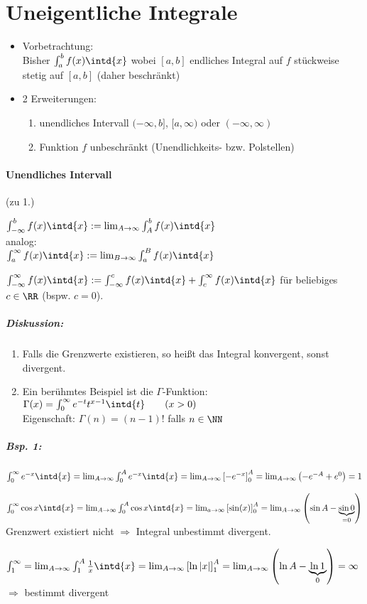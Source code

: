\section{Uneigentliche Integrale}
\begin{itemize}
\item Vorbetrachtung:\\
Bisher $\int_a^b f(x) \intd{x}$ wobei $[a,b]$ endliches Integral auf $f$ stückweise stetig auf $[a,b]$ (daher beschränkt)
\item 2 Erweiterungen:
\begin{enumerate}
\item unendliches Intervall $(-\infty, b]$, $[a,\infty)$ oder $(-\infty, \infty)$
\item Funktion $f$ unbeschränkt (Unendlichkeits- bzw. Polstellen)
\end{enumerate}
\end{itemize}
\paragraph{Unendliches Intervall} (zu 1.)
\begin{anumerate}
\item $\int_{-\infty}^b f(x) \intd{x}:= \lim_{A\to \infty} \int_A^b f(x) \intd{x}$\\
analog:\\
$\int_a^{\infty} f(x) \intd{x} := \lim_{B \to \infty} \int_a^{B} f(x) \intd{x}$
\item $\int_{-\infty}^{\infty} f(x) \intd{x} := \int_{-\infty}^c f(x) \intd{x} + \int_c^{\infty} f(x) \intd{x}$ für beliebiges $c \in \RR$ (bspw. $c=0$).
\end{anumerate}
\subparagraph{Diskussion:}
\begin{enumerate}
\item Falls die Grenzwerte existieren, so heißt das Integral konvergent, sonst divergent.
\item Ein berühmtes Beispiel ist die $\Gamma$-Funktion:\\
$\Gamma (x) = \int_0^{\infty} e^{-t} t^{x-1} \intd{t} \qquad (x >0 )$\\
Eigenschaft: $\Gamma (n) = (n-1)!$ falls $n \in \NN$
\end{enumerate}
\subparagraph{Bsp. 1:} 
\begin{anumerate}
\item $\int_0^{\infty} e^{-x} \intd{x} = \lim_{A \to \infty} \int_0^A e^{-x} \intd{x} = \lim_{A \to \infty} \left[ -e^{-x}\right]_0^A = \lim_{A \to \infty} \left( -e^{-A}+e^0\right) =1$
\item $\int_0^{\infty} \cos x \intd{x}= \lim_{A\to \infty} \int_0^A \cos x \intd{x} = \lim_{a\to \infty} \left[ \sin (x) \right]_0^A = \lim_{A\to \infty} \left( \sin A - \underbrace{\sin 0}_{=0}\right)$\\
Grenzwert existiert nicht $\Rightarrow$ Integral unbestimmt divergent.
\item $\int_1^{\infty} = \lim_{A\to \infty} \int_1^A \frac{1}{x} \intd{x} = \lim_{A\to \infty} \left[ \ln | x| \right]_1^A = \lim_{A\to \infty} \left( \ln A - \underbrace{\ln 1}_{0}\right) = \infty$\\
$\Rightarrow$ bestimmt divergent
\end{anumerate}
